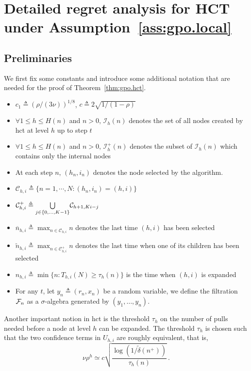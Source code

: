 \section{Detailed regret analysis for HCT under Assumption~\ref{ass:gpo.local}}\label{app:gpo.hct}

\subsection{Preliminaries}\label{proof:pre}
We first fix some constants and introduce some additional notation that are needed for the proof of Theorem~\ref{thm:gpo.hct}.
\begin{itemize}
    \item $c_1 \triangleq (\rho/(3\nu))^{1/8}$, $c \triangleq 2\sqrt{1/(1-\rho)}$
    \item $\forall 1\leq h\leq H(n)$ and $n>0$, $\mathcal{I}_h(n)$ denotes the set of all nodes created by \gls{hct} at level $h$ up to step $t$
    \item $\forall 1\leq h\leq H(n)$ and $n>0$, $\mathcal{I}_h^{+}(n)$ denotes the subset of $\mathcal{I}_h(n)$ which contains only the internal nodes
    \item At each step $n$, $(h_n,i_n)$ denotes the node selected by the algorithm.
    \item $\mathcal{C}_{h,i} \triangleq \{n = 1,\cdots,N : (h_n,i_n) = (h,i)\}$
    \item $\mathcal{C}_{h,i}^{+} \triangleq \underset{j\in\{0,\ldots,K-1\}}{\bigcup} \mathcal{C}_{h+1,Ki-j}$
    \item $\overline{n}_{h,i} \triangleq \max_{n\in\mathcal{C}_{h,i}} n$ denotes the last time $(h,i)$ has been selected
    \item $\tilde{n}_{h,i} \triangleq \max_{n\in\mathcal{C}_{h,i}^{+}} n$ denotes the last time when one of its children has been selected
    \item $n_{h,i} \triangleq \min\{n: T_{h,i}(N) \geq \tau_h(n)\}$ is the time when $(h,i)$ is expanded
    \item For any $t$, let $y_n\triangleq(r_n,x_n)$ be a random variable, we define the filtration $\mathcal{F}_n$ as a $\sigma$-algebra generated by $(y_1,\ldots,y_n)$.
\end{itemize}
Another important notion in \gls{hct} is the threshold $\tau_h$ on the number of pulls needed before a node at level $h$ can be expanded.
The threshold $\tau_h$ is chosen such that the two confidence terms in $U_{h,i}$ are roughly equivalent, that is,
\[
    \nu\rho^h \simeq c\sqrt{\frac{\log(1/\tilde{\delta}(n^+))}{\tau_h(n)}}\,.
\]
